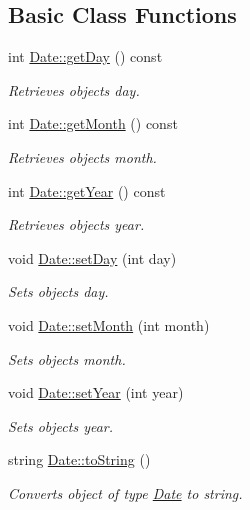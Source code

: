 \subsection*{Basic Class Functions}
\begin{DoxyCompactItemize}
\item 
int \hyperlink{group___date_ga0f253815240e70f4c39cb93cc68bd3f4}{Date\+::get\+Day} () const
\begin{DoxyCompactList}\small\item\em Retrieves object\textquotesingle{}s day. \end{DoxyCompactList}\item 
int \hyperlink{group___date_ga332f6e3a2f6a40d73742b6dab7be0f64}{Date\+::get\+Month} () const
\begin{DoxyCompactList}\small\item\em Retrieves object\textquotesingle{}s month. \end{DoxyCompactList}\item 
int \hyperlink{group___date_ga8b0869f34c2b38d108ab83ee2e770e5d}{Date\+::get\+Year} () const
\begin{DoxyCompactList}\small\item\em Retrieves object\textquotesingle{}s year. \end{DoxyCompactList}\item 
void \hyperlink{group___date_ga2f97b9d1ac5ef0ef6b6cab3335c5303d}{Date\+::set\+Day} (int day)
\begin{DoxyCompactList}\small\item\em Sets object\textquotesingle{}s day. \end{DoxyCompactList}\item 
void \hyperlink{group___date_ga23aa56014dd581d691607df5d4474f64}{Date\+::set\+Month} (int month)
\begin{DoxyCompactList}\small\item\em Sets object\textquotesingle{}s month. \end{DoxyCompactList}\item 
void \hyperlink{group___date_ga895c4ae9868e43577cf59d9c679d7a71}{Date\+::set\+Year} (int year)
\begin{DoxyCompactList}\small\item\em Sets object\textquotesingle{}s year. \end{DoxyCompactList}\item 
string \hyperlink{group___date_gadebdb45904dc2fbfacc66aa7528e0c04}{Date\+::to\+String} ()
\begin{DoxyCompactList}\small\item\em Converts object of type \hyperlink{class_date}{Date} to string. \end{DoxyCompactList}\end{DoxyCompactItemize}
